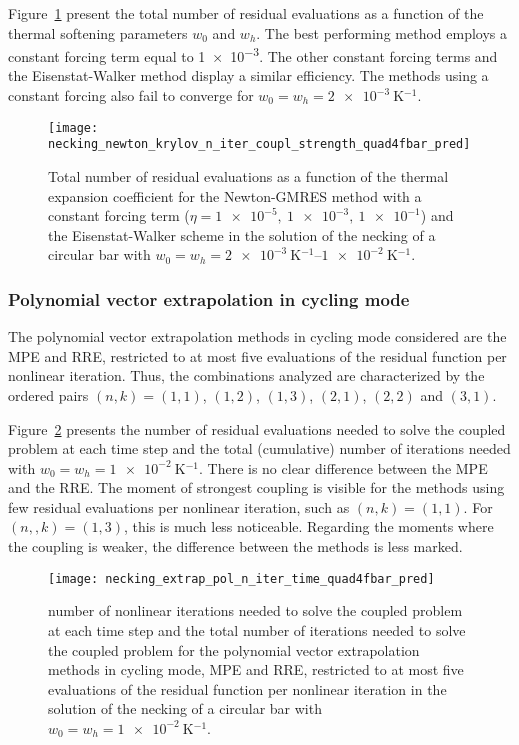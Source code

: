 Figure~\ref{fig:necking_newton_krylov_n_iter_coupl_strength_quad4fbar_pred} present the total number of residual evaluations as a function of the thermal softening parameters \(w_0\) and \(w_h\).
The best performing method employs a constant forcing term equal to \num{1e-3}.
The other constant forcing terms and the Eisenstat-Walker method display a similar efficiency.
The methods using a constant forcing also fail to converge for \(w_0=w_h=\SI{2e-3}{\kelvin^{-1}}\).

\begin{figure}
 \centering
 \texttt{[image: necking\_newton\_krylov\_n\_iter\_coupl\_strength\_quad4fbar\_pred]}
 \caption{Total number of residual evaluations as a function of the thermal expansion coefficient for the Newton-GMRES method with a constant forcing term (\(\eta=\num{1e-5},\ \num{1e-3},\ \num{1e-1}\)) and the Eisenstat-Walker scheme in the solution of the necking of a circular bar with \(w_0=w_h=\SIrange{2e-3}{1e-2}{\kelvin^{-1}}\).}
\label{fig:necking_newton_krylov_n_iter_coupl_strength_quad4fbar_pred}
\end{figure}

\FloatBarrier

\subsubsection{Polynomial vector extrapolation in cycling mode}

The polynomial vector extrapolation methods in cycling mode considered are the MPE and RRE, restricted to at most five evaluations of the residual function per nonlinear iteration.
Thus, the combinations analyzed are characterized by the ordered pairs \((n,k)=(1,1)\), \((1,2)\), \((1,3)\), \((2,1)\), \((2,2)\) and \((3,1)\).

Figure~\ref{fig:necking_extrap_pol_n_iter_time_quad4fbar_pred} presents the number of residual evaluations needed to solve the coupled problem at each time step and the total (cumulative) number of iterations needed with \(w_0=w_h=\SI{1e-2}{\kelvin^{-1}}\).
There is no clear difference between the MPE and the RRE.
The moment of strongest coupling is visible for the methods using few residual evaluations per nonlinear iteration, such as \((n,k)=(1,1)\).
For \((n,,k)=(1,3)\), this is much less noticeable.
Regarding the moments where the coupling is weaker, the difference between the methods is less marked.

\begin{figure}[htbp]
 \centering
 \texttt{[image: necking\_extrap\_pol\_n\_iter\_time\_quad4fbar\_pred]}
 \caption{number of nonlinear iterations needed to solve the coupled problem at each time step and the total number of iterations needed to solve the coupled problem for the polynomial vector extrapolation methods in cycling mode, MPE and RRE, restricted to at most five evaluations of the residual function per nonlinear iteration in the solution of the necking of a circular bar with \(w_0=w_h=\SI{1e-2}{\kelvin^{-1}}\).}
\label{fig:necking_extrap_pol_n_iter_time_quad4fbar_pred}
\end{figure}

